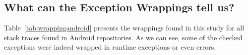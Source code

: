 \documentclass[conference]{IEEEtran}
\begin{document}


\noindent {}

\subsection{What can the Exception Wrappings tell us?}

Table~\ref{tab:wrappingandroid} presents the wrappings found in this study for all
stack traces found in Android repositories. As we can see, some of the checked
exceptions were indeed wrapped in runtime exceptions or even errors.





\end{document}
